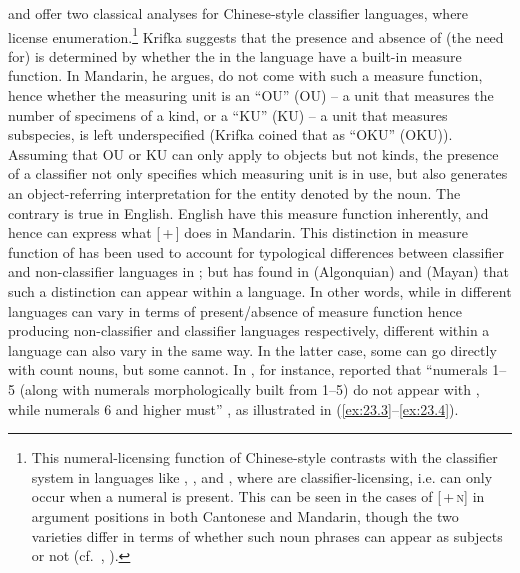 \documentclass[output=paper]{langsci/langscibook}
\begin{document}
\citet{Krifka1995} and \citet{Chierchia1998} offer two classical analyses for
Chinese-style classifier languages, where 
license enumeration.\footnote{This numeral-licensing function of Chinese-style
     contrasts with the classifier system in
    languages like  \citep{Watanabe2006}, 
    \parencite{VazquezRojasMaldonado2012}, and  \citep{Massam2009},
    where  are classifier-licensing, i.e.   can
    only occur when a numeral is present. This can be seen in the
    cases of [\Clf{}\,+\,\textsc{n}] in argument positions in both Cantonese and
    Mandarin, though the two varieties differ in terms of whether such noun
    phrases can appear as subjects or not (cf.\ \citealt{ChengSybesma1999},
\citealt{Sio2006}).} Krifka suggests that the presence and absence of (the need
for)  is determined by whether the  in the
language have a built-in measure function. In Mandarin, he argues,
 do not come with such a measure function, hence whether the
measuring unit is an \enquote{\glsdesc{OU}} (\gls{OU}) -- a unit
that measures the number of specimens of a kind, or a \enquote{\glsdesc{KU}}
(\gls{KU}) -- a unit that measures subspecies, is left
underspecified (Krifka coined that as \enquote{\glsdesc{OKU}}
(\gls{OKU})). Assuming that \gls{OU} or \gls{KU} can only apply
to objects but not kinds, the presence of a classifier not only
specifies which measuring unit is in use, but also generates an
object-referring interpretation for the entity denoted by the noun. The
contrary is true in English. English  have this measure function
inherently, and hence can express what [\Num{}\,+\,\Clf] does in
Mandarin.  This distinction in measure function of 
has been used to account for typological differences between
classifier and non-classifier languages in \citet{Krifka1995};
but \citet{BaleCoon2014} has found in  (Algonquian) and 
(Mayan) that such a distinction can appear within a language. In other words,
while  in different languages can vary in terms of
present/absence of measure function hence producing non-classifier and
classifier languages respectively, different  within a language
can also vary in the same way. In the latter case, some  can go
directly with count nouns, but some cannot. In , for instance,
\citeauthor{BaleCoon2014} reported that “numerals 1--5 (along with numerals
morphologically built from 1--5) do not appear with , while
numerals 6 and higher must” \parencite[700]{BaleCoon2014}, as illustrated in
(\ref{ex:23.3}--\ref{ex:23.4}).
\end{document}
